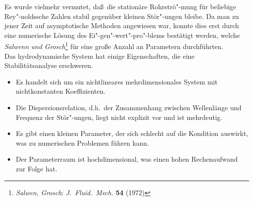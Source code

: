 \documentclass[10pt,a5paper,oneside,draft]{book}
\numberwithin{equation}{chapter}
\begin{document}
Es wurde vielmehr vermutet, da\ss\ die station\"are Rohrstr\"o"-mung f\"ur beliebige Rey"-noldssche Zahlen stabil gegen\"uber kleinen St\"or"-ungen bleibe.
Da man zu jener Zeit auf asymptotische Methoden angewiesen war, konnte dies erst durch eine numerische L\"osung des Ei"-gen"-wert"-pro"-blems best\"atigt werden, welche \textsl{Salwenn und Grosch}\footnote{\label{bib:salwen_grosch}\textsl{Salwen, Grosch}: \textit{J.\ Fluid.\ Mech.} \textbf{54} (1972)} f\"ur eine gro\ss e Anzahl an Parametern durchf\"uhrten.\\

Das hydrodynamische System hat einige Eigenschaften, die eine Stabilit\"atsanalyse erschweren.
\begin{itemize}
	\item Es handelt sich um ein nichtlineares mehrdimensionales System mit nichtkonstanten Koeffizienten.
	\item Die Dispersionsrelation, d.h.\ der Zusammenhang zwischen Wellenl\"ange und Frequenz der St\"or"-ungen, liegt nicht explizit vor und ist mehrdeutig.
	\item Es gibt einen kleinen Parameter, der sich schlecht auf die Kondition auswirkt, was zu numerischen Problemen f\"uhren kann.
	\item Der Parameterraum ist hochdimensional, was einen hohen Rechenaufwand zur Folge hat.
\end{itemize}
\end{document}
